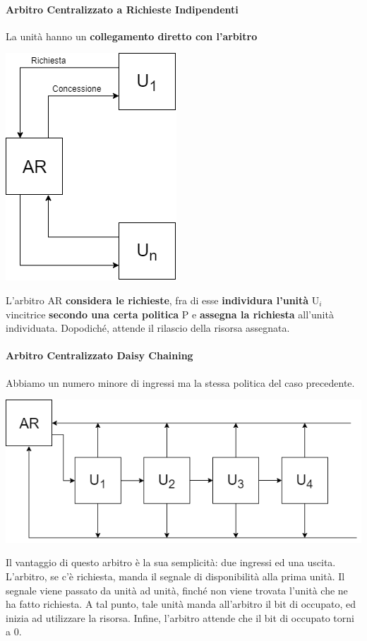 \documentclass[10pt]{report}
\begin{document}
\paragraph{Arbitro Centralizzato a Richieste Indipendenti} La unità hanno un \textbf{collegamento diretto con l'arbitro}
\begin{multicols}{2}
\begin{center}
\includegraphics[scale=0.5]{arcentrrichind.png}
\end{center}
\columnbreak
L'arbitro AR \textbf{considera le richieste}, fra di esse \textbf{individura l'unità} U$_i$ vincitrice \textbf{secondo una certa politica} P e \textbf{assegna la richiesta} all'unità individuata. Dopodiché, attende il rilascio della risorsa assegnata.
\end{multicols}
\paragraph{Arbitro Centralizzato Daisy Chaining} Abbiamo un numero minore di ingressi ma la stessa politica del caso precedente.
\begin{center}
\includegraphics[scale=0.5]{arcentrdaisy.png}
\end{center}
Il vantaggio di questo arbitro è la sua semplicità: due ingressi ed una uscita.\\
L'arbitro, se c'è richiesta, manda il segnale di disponibilità alla prima unità. Il segnale viene passato da unità ad unità, finché non viene trovata l'unità che ne ha fatto richiesta. A tal punto, tale unità manda all'arbitro il bit di occupato, ed inizia ad utilizzare la risorsa. Infine, l'arbitro attende che il bit di occupato torni a 0.
\end{document}
